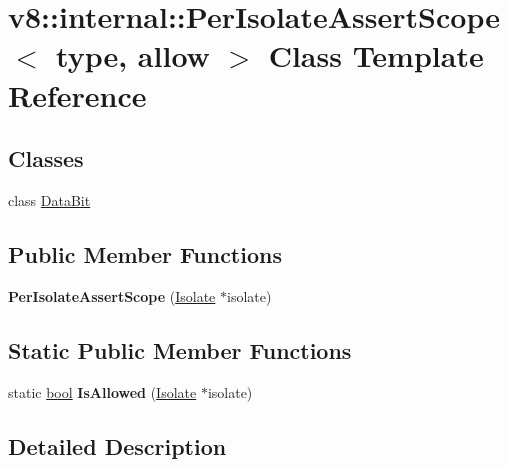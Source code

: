 \hypertarget{classv8_1_1internal_1_1PerIsolateAssertScope}{}\section{v8\+:\+:internal\+:\+:Per\+Isolate\+Assert\+Scope$<$ type, allow $>$ Class Template Reference}
\label{classv8_1_1internal_1_1PerIsolateAssertScope}
\subsection*{Classes}
\begin{DoxyCompactItemize}
\item 
class \mbox{\hyperlink{classv8_1_1internal_1_1PerIsolateAssertScope_1_1DataBit}{Data\+Bit}}
\end{DoxyCompactItemize}
\subsection*{Public Member Functions}
\begin{DoxyCompactItemize}
\item 
\mbox{\label{classv8_1_1internal_1_1PerIsolateAssertScope_afbc3795af325ea428c90ef81665cb5e2}} 
{\bfseries Per\+Isolate\+Assert\+Scope} (\mbox{\hyperlink{classv8_1_1internal_1_1Isolate}{Isolate}} $\ast$isolate)
\end{DoxyCompactItemize}
\subsection*{Static Public Member Functions}
\begin{DoxyCompactItemize}
\item 
\mbox{\label{classv8_1_1internal_1_1PerIsolateAssertScope_a11578ac71c68b5d24a690956e50b740f}} 
static \mbox{\hyperlink{classbool}{bool}} {\bfseries Is\+Allowed} (\mbox{\hyperlink{classv8_1_1internal_1_1Isolate}{Isolate}} $\ast$isolate)
\end{DoxyCompactItemize}


\subsection{Detailed Description}
